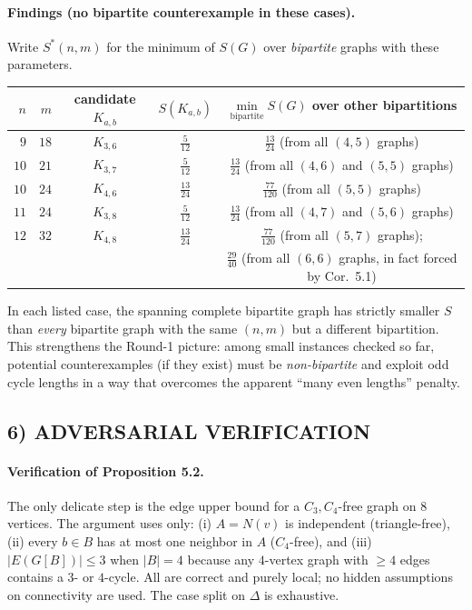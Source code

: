 \paragraph{Findings (no bipartite counterexample in these cases).}
Write $S^*(n,m)$ for the minimum of $S(G)$ over \emph{bipartite} graphs with these parameters.
\begin{center}
\begin{tabular}{r|r|c|c|c}
$n$ & $m$ & candidate $K_{a,b}$ & $S(K_{a,b})$ & $\min\limits_{\text{bipartite}} S(G)$ over other bipartitions \\
\hline
$9$  & $18$ & $K_{3,6}$ & $\frac{5}{12}$ & $\frac{13}{24}$ (from all $(4,5)$ graphs) \\
$10$ & $21$ & $K_{3,7}$ & $\frac{5}{12}$ & $\frac{13}{24}$ (from all $(4,6)$ and $(5,5)$ graphs) \\
$10$ & $24$ & $K_{4,6}$ & $\frac{13}{24}$ & $\frac{77}{120}$ (from all $(5,5)$ graphs) \\
$11$ & $24$ & $K_{3,8}$ & $\frac{5}{12}$ & $\frac{13}{24}$ (from all $(4,7)$ and $(5,6)$ graphs) \\
$12$ & $32$ & $K_{4,8}$ & $\frac{13}{24}$ & $\frac{77}{120}$ (from all $(5,7)$ graphs); \\ &&&& $\frac{29}{40}$ (from all $(6,6)$ graphs, in fact forced by Cor.~5.1)
\end{tabular}
\end{center}
In each listed case, the spanning complete bipartite graph has strictly smaller $S$ than \emph{every} bipartite graph with the same $(n,m)$ but a different bipartition.
This strengthens the Round-1 picture: among small instances checked so far, potential counterexamples (if they exist) must be \emph{non-bipartite} and exploit odd cycle lengths in a way that overcomes the apparent ``many even lengths'' penalty.

\subsection*{6) \textbf{ADVERSARIAL VERIFICATION}}
\paragraph{Verification of Proposition 5.2.}
The only delicate step is the edge upper bound for a $C_3,C_4$-free graph on $8$ vertices.
The argument uses only:
(i) $A=N(v)$ is independent (triangle-free),
(ii) every $b\in B$ has at most one neighbor in $A$ ($C_4$-free), and
(iii) $|E(G[B])|\le 3$ when $|B|=4$ because any $4$-vertex graph with $\ge4$ edges contains a $3$- or $4$-cycle.
All are correct and purely local; no hidden assumptions on connectivity are used.
The case split on $\Delta$ is exhaustive.

